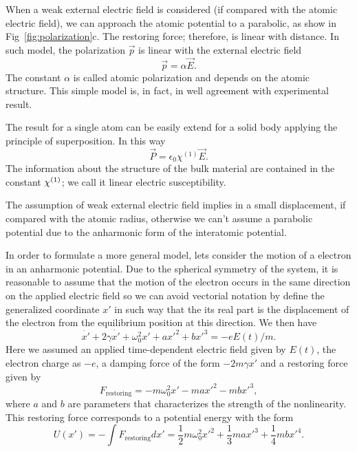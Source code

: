 When a weak external electric field is considered (if compared with the atomic electric field), we can approach the atomic potential to a parabolic, as show in Fig~\ref{fig:polarization}c. The restoring force; therefore, is linear with distance. In such model, the polarization $\vec{p}$ is linear with the external electric field
\begin{equation}
    \vec{p} = \alpha \vec{E}.
\end{equation}
The constant $\alpha$ is called atomic polarization and depends on the atomic structure. This simple model is, in fact, in well agreement with experimental result.  

The result for a single atom can be easily extend for a solid body applying the principle of  superposition. In this way
\begin{equation}
    \vec{P} = \epsilon_0\chi^{(1)}\vec{E}.
\end{equation}
The information about the structure of the bulk material are contained in the constant $\chi^{( 1)}$; we call it linear electric susceptibility.

The assumption of weak external electric field implies in a small displacement, if compared with the atomic radius, otherwise we can't assume a parabolic potential due to the anharmonic form of the interatomic potential. 

In order to formulate a more general model, lets consider the motion of a electron in an anharmonic potential. Due to the spherical symmetry of the system, it is reasonable to assume that the motion of the electron occurs in the same direction on the applied electric field so we can avoid vectorial notation by define the generalized coordinate $x'$ in such way that the its real part is the displacement of the electron from the equilibrium position at this direction. We then have
\begin{equation}
    \ddot{x'} + 2\gamma\dot{x'} + \omega_0^2x'+ax'^2+bx'^3 = -eE(t)/m.
    \label{eq:motion_equation_electron}
\end{equation}
Here we assumed an applied time-dependent electric field given by $E(t)$, the electron charge as $-e$, a damping force of the form $-2m\gamma\dot{x'}$ and a restoring force given by
\begin{equation}
    F_\text{restoring} = -m\omega_0^2x' -max'^2 -mbx'^3, 
\end{equation}
where $a$ and $b$ are parameters that characterizes the strength of the nonlinearity. This restoring force corresponds to a potential energy with the form 
\begin{equation}
    U(x') = -\int F_\text{restoring} dx' = \frac{1}{2}m\omega_0^2x'^2 +\frac{1}{3}max'^3 +\frac{1}{4}mbx'^4.
\end{equation}

